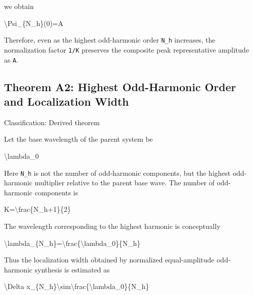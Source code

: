 \documentclass[
  a4paper]{article}
\newenvironment{Shaded}{}{}
\newcommand{\NormalTok}[1]{#1}
\begin{document}
we obtain

\begin{Shaded}
\begin{Highlighting}[]
\NormalTok{\textbackslash{}Psi\_\{N\_h\}(0)=A}
\end{Highlighting}
\end{Shaded}

Therefore, even as the highest odd-harmonic order \texttt{N\_h}
increases, the normalization factor \texttt{1/K} preserves the composite
peak representative amplitude as \texttt{A}.

\subsection{Theorem A2: Highest Odd-Harmonic Order and Localization
Width}\label{theorem-a2-highest-odd-harmonic-order-and-localization-width}

Classification: Derived theorem

Let the base wavelength of the parent system be

\begin{Shaded}
\begin{Highlighting}[]
\NormalTok{\textbackslash{}lambda\_0}
\end{Highlighting}
\end{Shaded}

Here \texttt{N\_h} is not the number of odd-harmonic components, but the
highest odd-harmonic multiplier relative to the parent base wave. The
number of odd-harmonic components is

\begin{Shaded}
\begin{Highlighting}[]
\NormalTok{K=\textbackslash{}frac\{N\_h+1\}\{2\}}
\end{Highlighting}
\end{Shaded}

The wavelength corresponding to the highest harmonic is conceptually

\begin{Shaded}
\begin{Highlighting}[]
\NormalTok{\textbackslash{}lambda\_\{N\_h\}=\textbackslash{}frac\{\textbackslash{}lambda\_0\}\{N\_h\}}
\end{Highlighting}
\end{Shaded}

Thus the localization width obtained by normalized equal-amplitude
odd-harmonic synthesis is estimated as

\begin{Shaded}
\begin{Highlighting}[]
\NormalTok{\textbackslash{}Delta x\_\{N\_h\}\textbackslash{}sim\textbackslash{}frac\{\textbackslash{}lambda\_0\}\{N\_h\}}
\end{Highlighting}
\end{Shaded}
\end{document}

